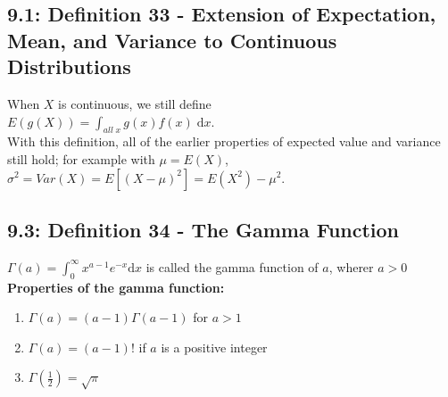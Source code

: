 \documentclass[11pt]{article}
\begin{document}
	 \subsection*{9.1: Definition 33 - Extension of Expectation, Mean, and Variance to Continuous Distributions}
	 	When $X$ is continuous, we still define\\
	 	$E(g(X))=\int_{all\; x} \!g(x)f(x)\; \mathrm{d}x$.\\
	 	With this definition, all of the earlier properties of expected value and variance still hold; for example with $\mu=E(X)$,\\
	 	
	 	$\sigma^2 = Var(X)=E[(X-\mu)^2]=E(X^2)-\mu^2$.
	 	
	 \subsection*{9.3: Definition 34 - The Gamma Function}
	 	$\Gamma (a)  = \int_0^\infty \!x^{a-1}e^{-x} \mathrm{d}x$ is called the gamma function of $a$, wherer $a>0$\\
	 	{\bf Properties of the gamma function:}\\
	 	\begin{enumerate}
	 		\item $\Gamma(a)= (a-1)\Gamma (a-1)$ for $a>1$\\
	 		\item $\Gamma(a)=(a-1)!$ if $a$ is a positive integer\\
			\item $\Gamma(\frac{1}{2})=\sqrt{\pi}$
	 	\end{enumerate}
	 	
	 	
	 	
	 	
		
\end{document}
